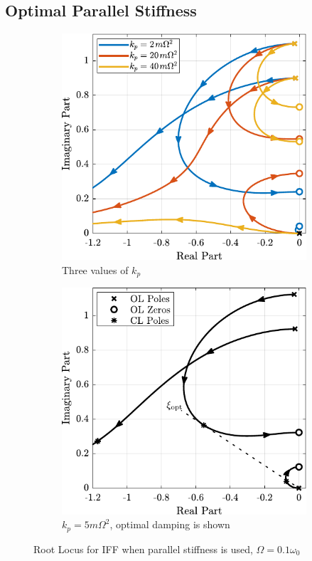 \documentclass{ISMA_USD2020}
\begin{document}
\subsection{Optimal Parallel Stiffness}
\label{sec:org8a2fab9}
\begin{figure}[htbp]
\begin{subfigure}[c]{0.49\linewidth}
\includegraphics[width=\linewidth]{figs/root_locus_iff_kps.pdf}
\caption{\label{fig:root_locus_iff_kps} Three values of \(k_p\)}
\end{subfigure}
\begin{subfigure}[c]{0.49\linewidth}
\includegraphics[width=\linewidth]{figs/root_locus_opt_gain_iff_kp.pdf}
\caption{\label{fig:root_locus_opt_gain_iff_kp} \(k_p = 5 m \Omega^2\), optimal damping is shown}
\end{subfigure}
\caption{\label{fig:root_locus_iff_kps_opt}Root Locus for IFF when parallel stiffness is used, \(\Omega = 0.1 \omega_0\)}
\centering
\end{figure}
\end{document}
